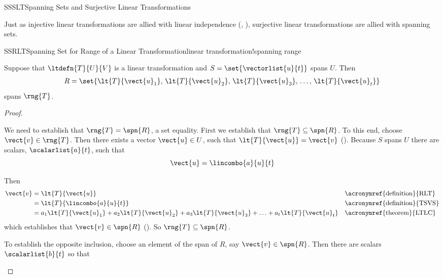 %
\begin{subsect}{SSSLT}{Spanning Sets and Surjective Linear Transformations}
%
\begin{para}Just as injective linear transformations are allied with linear independence (, ), surjective linear transformations are allied with spanning sets.\end{para}
%
\begin{theorem}{SSRLT}{Spanning Set for Range of a Linear Transformation}{linear transformation!spanning range}
\begin{para}Suppose that $\ltdefn{T}{U}{V}$ is a linear transformation and $S=\set{\vectorlist{u}{t}}$ spans $U$.  Then
%
\begin{align*}
R=\set{\lt{T}{\vect{u}_1},\,\lt{T}{\vect{u}_2},\,\lt{T}{\vect{u}_3},\,\ldots,\,\lt{T}{\vect{u}_t}}
\end{align*}
%
spans $\rng{T}$.\end{para}
\end{theorem}
%
\begin{proof}
\begin{para}We need to establish that $\rng{T}=\spn{R}$, a set equality.  First we establish that $\rng{T}\subseteq\spn{R}$.  To this end, choose $\vect{v}\in\rng{T}$.  Then there exists a vector $\vect{u}\in U$, such that $\lt{T}{\vect{u}}=\vect{v}$ ().  Because $S$ spans $U$ there are scalars, $\scalarlist{a}{t}$, such that
%
\begin{equation*}
\vect{u}=\lincombo{a}{u}{t}
\end{equation*}
\end{para}
%
\begin{para}Then
%
\begin{align*}
\vect{v}
&=\lt{T}{\vect{u}}&&\text{\acronymref{definition}{RLT}}\\
&=\lt{T}{\lincombo{a}{u}{t}}&&\text{\acronymref{definition}{TSVS}}\\
&=a_1\lt{T}{\vect{u}_1}+a_2\lt{T}{\vect{u}_2}+a_3\lt{T}{\vect{u}_3}+\ldots+a_t\lt{T}{\vect{u}_t}&&\text{\acronymref{theorem}{LTLC}}\\
\end{align*}
%
which establishes that $\vect{v}\in\spn{R}$ ().  So $\rng{T}\subseteq\spn{R}$.\end{para}
%
\begin{para}To establish the opposite inclusion, choose an element of the span of $R$, say $\vect{v}\in\spn{R}$.  Then there are scalars $\scalarlist{b}{t}$ so that

\end{para}
\end{proof}
\end{subsect}
